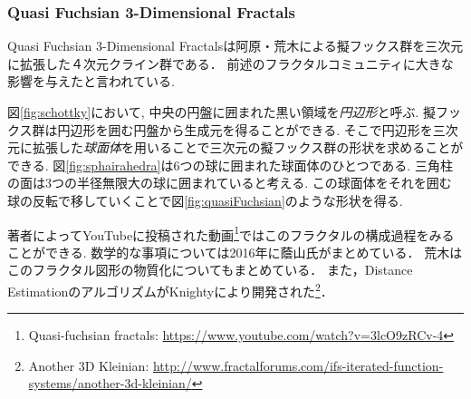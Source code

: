 \subsubsection{Quasi Fuchsian 3-Dimensional Fractals}

Quasi Fuchsian 3-Dimensional Fractalsは阿原・荒木による擬フックス群を三次元に拡張した４次元クライン群である\cite{sphairahedra}\cite{sphairahedraJa}．
前述のフラクタルコミュニティに大きな影響を与えたと言われている.

図\ref{fig:schottky}において, 中央の円盤に囲まれた黒い領域を\emph{円辺形}と呼ぶ.
擬フックス群は円辺形を囲む円盤から生成元を得ることができる.
そこで円辺形を三次元に拡張した\emph{球面体}を用いることで三次元の擬フックス群の形状を求めることができる.
図\ref{fig:sphairahedra}は6つの球に囲まれた球面体のひとつである.
三角柱の面は3つの半径無限大の球に囲まれていると考える.
この球面体をそれを囲む球の反転で移していくことで図\ref{fig:quasiFuchsian}のような形状を得る.

著者によってYouTubeに投稿された動画\footnote{Quasi-fuchsian fractals: \url{https://www.youtube.com/watch?v=3lcO9zRCv-4}}ではこのフラクタルの構成過程をみることができる.
数学的な事項については2016年に蔭山氏がまとめている\cite{kageyama}．
荒木はこのフラクタル図形の物質化についてもまとめている\cite{materializing}．
また，Distance EstimationのアルゴリズムがKnightyにより開発された\footnote{Another 3D Kleinian: \url{http://www.fractalforums.com/ifs-iterated-function-systems/another-3d-kleinian/}}．

